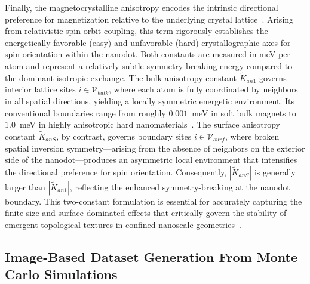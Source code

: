\documentclass[a4paper,fleqn]{cas-sc}
\begin{document}
Finally, the magnetocrystalline anisotropy encodes the intrinsic directional preference for magnetization relative to the underlying crystal lattice~\cite{cullity2011introduction}. Arising from 
relativistic spin-orbit coupling, this term rigorously establishes the energetically favorable (easy) and unfavorable (hard) crystallographic axes for spin orientation within the nanodot. Both constants are measured in meV per atom and represent a relatively subtle symmetry-breaking energy compared to the dominant isotropic 
exchange. The bulk anisotropy constant $\tilde{K}_{an1}$ governs interior lattice sites $i \in \mathcal{V}_{bulk}$, where each atom is fully coordinated by neighbors in all spatial directions, yielding a locally symmetric energetic environment. Its conventional boundaries range from roughly $0.001$~meV in soft bulk magnets to $1.0$~meV in 
highly anisotropic hard nanomaterials~\cite{cullity2011introduction}. The surface anisotropy constant $\tilde{K}_{anS}$, by contrast, 
governs boundary sites $i \in \mathcal{V}_{surf}$, where broken spatial inversion symmetry---arising from the absence of neighbors on the exterior side of the nanodot---produces an asymmetric local environment that intensifies the directional preference for spin orientation. Consequently, $|\tilde{K}_{anS}|$ is generally larger than $|\tilde{K}_{an1}|$, reflecting the enhanced symmetry-breaking at the nanodot boundary. This two-constant formulation is essential for accurately capturing the finite-size and surface-dominated effects that critically govern the stability of emergent topological textures 
in confined nanoscale geometries~\cite{fert2024electrical,borisov2021heisenberg}.

\subsection{Image-Based Dataset Generation From Monte Carlo Simulations}\label{sec:montecarlo_sim}
\end{document}
